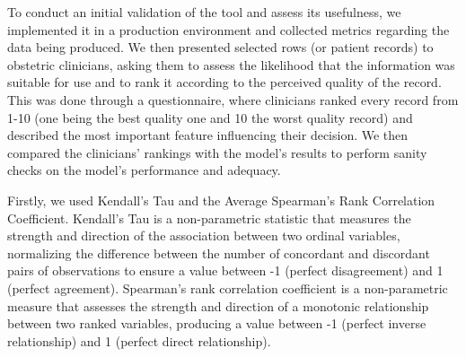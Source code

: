 
To conduct an initial validation of the tool and assess its usefulness, we implemented it in a production environment and collected metrics regarding the data being produced. We then presented selected rows (or patient records) to obstetric clinicians, asking them to assess the likelihood that the information was suitable for use and to rank it according to the perceived quality of the record. This was done through a questionnaire, where clinicians ranked every record from 1-10 (one being the best quality one and 10 the worst quality record) and described the most important feature influencing their decision. We then compared the clinicians' rankings with the model's results to perform sanity checks on the model's performance and adequacy.

Firstly, we used Kendall's Tau and the Average Spearman's Rank Correlation Coefficient. Kendall's Tau is a non-parametric statistic that measures the strength and direction of the association between two ordinal variables, normalizing the difference between the number of concordant and discordant pairs of observations to ensure a value between -1 (perfect disagreement) and 1 (perfect agreement). Spearman's rank correlation coefficient is a non-parametric measure that assesses the strength and direction of a monotonic relationship between two ranked variables, producing a value between -1 (perfect inverse relationship) and 1 (perfect direct relationship).

